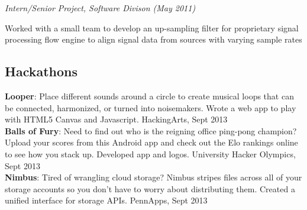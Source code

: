 \documentclass{article}
\newcommand{\position}[2]{
  \textit{#1 (#2)}
}
\newenvironment{achievements}{
  \begin{compactitem} }{
  \end{compactitem}
}
\newcommand{\skill}[2]{
  \textbf{#1}: #2
  \smallskip
}
\begin{document}
    \position {Intern/Senior Project, Software Divison} {May 2011}
    \begin{achievements}
      \item Worked with a small team to develop an up-sampling filter for
      proprietary signal processing flow engine to align signal data from sources
      with varying sample rates
    \end{achievements}

\subsection*{Hackathons}
  \skill{Looper}
        {%
        Place different sounds
        around a circle to create musical loops that can be connected,
        harmonized, or turned into noisemakers. Wrote a web app to play with
        HTML5 Canvas and Javascript. HackingArts, Sept 2013} \\
  \skill{Balls of Fury}
        {Need to find out who is the reigning office ping-pong champion?
        Upload your scores from this Android app and check out the Elo
        rankings online to see how you stack up. Developed app and
        logos. University Hacker Olympics, Sept 2013} \\
  \skill{Nimbus}
        {Tired of wrangling cloud storage? Nimbus stripes files
        across all of your storage accounts so you don't have to worry about
        distributing them. Created a unified interface for storage APIs.
        PennApps, Sept 2013} %

\begin{comment}
\subsection*{Projects}
  \skill{Type Inference}
        {Implemented Hindley-Milner type inference for a teaching language in
        ML. Wrote a constraint solver to assign types to correct terms and
        reject ill-typed terms.} \\
  \skill{TapItOut}
        {Developed the front end of a native Android app that allows
        peer-to-peer money transfer using NFC technology. Built at the 2013
        University Hacker Olympics in San Francisco.} \\
  \skill{Virtual Machine}
        {Designed and wrote a 32-bit virtual machine in C. Implemented a set of
        basic operations and a macro assembler to create executable binary
        files. Wrote a calculator program in assembly.}
\end{comment}
\end{document}
